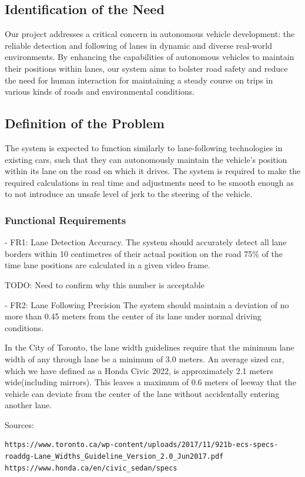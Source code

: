 \documentclass[titlepage]{article}
\begin{document}
\subsection{Identification of the Need}
Our project addresses a critical concern in autonomous vehicle development: the reliable detection and following of lanes in dynamic and diverse real-world environments. By enhancing the capabilities of autonomous vehicles to maintain their positions within lanes, our system aims to bolster road safety and reduce the need for human interaction for maintaining a steady course on trips in various kinds of roads and environmental conditions.


\subsection{Definition of the Problem}
The system is expected to function similarly to lane-following technologies in existing cars, such that they can autonomously maintain the vehicle’s position within its lane on the road on which it drives. The system is required to make the required calculations in real time and adjustments need to be smooth enough as to not introduce an unsafe level of jerk to the steering of the vehicle. 


\subsubsection{Functional Requirements}
- FR1: Lane Detection Accuracy. The system should accurately detect all lane borders within 10 centimetres of their actual position on the road 75\% of the time lane positions are calculated in a given video frame. 

TODO: Need to confirm why this number is acceptable

- FR2: Lane Following Precision
The system should maintain a deviation of no more than 0.45 meters from the center of its lane under normal driving conditions.

In the City of Toronto, the lane width guidelines require that the minimum lane width of any through lane be a minimum of 3.0 meters. An average sized car, which we have defined as a Honda Civic 2022, is approximately 2.1 meters wide(including mirrors). This leaves a maximum of 0.6 meters of leeway that the vehicle can deviate from the center of the lane without accidentally entering another lane.

Sources:

\begin{verbatim}
https://www.toronto.ca/wp-content/uploads/2017/11/921b-ecs-specs-roaddg-Lane_Widths_Guideline_Version_2.0_Jun2017.pdf
https://www.honda.ca/en/civic_sedan/specs
\end{verbatim}
\end{document}
